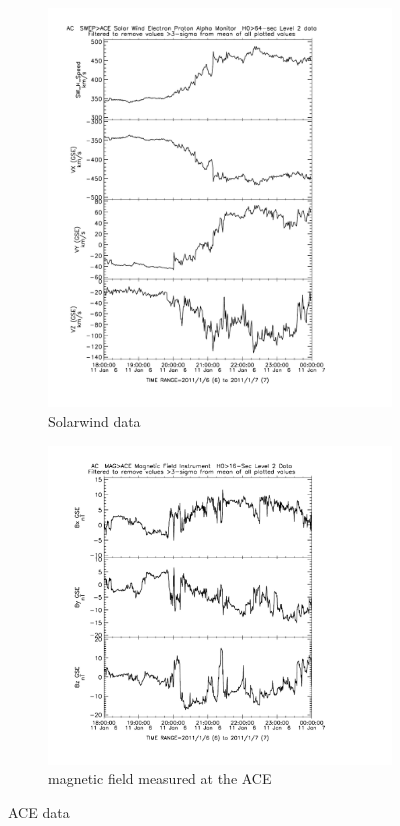 \documentclass[10pt,a4paper]{article}
\begin{document}
\begin{figure}[h]
\centering
\begin{subfigure}{0.45\textwidth}
\centering
	\includegraphics[width=\textwidth]{ACE_solarwindspeed.pdf}
	\caption{ Solarwind data\label{ACE Solarwindspeed}}
\end{subfigure}
\begin{subfigure}{0.45\textwidth}
\centering
\includegraphics[width=\textwidth]{ACE_magneticfield.pdf}
\caption{magnetic field measured at the ACE}
\end{subfigure}
\caption{ACE data}
\end{figure}
\end{document}

